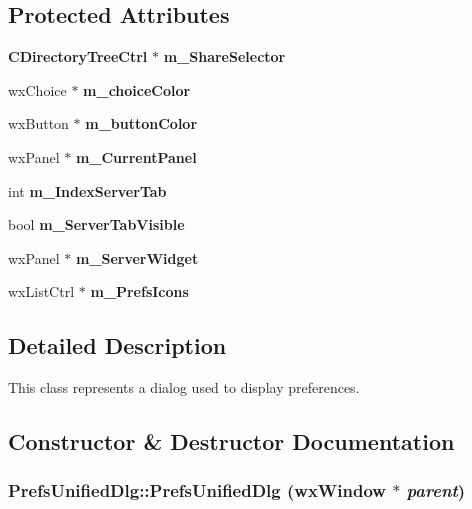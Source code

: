 \subsection*{Protected Attributes}
\begin{DoxyCompactItemize}
\item 
{\bf CDirectoryTreeCtrl} $\ast$ {\bf m\_\-ShareSelector}\label{classPrefsUnifiedDlg_a396a826d7bec6bb5ed15871d62a4e62c}

\item 
wxChoice $\ast$ {\bf m\_\-choiceColor}\label{classPrefsUnifiedDlg_ab6b3b1e27ca9256dfb94d5a53ce4969f}

\item 
wxButton $\ast$ {\bf m\_\-buttonColor}\label{classPrefsUnifiedDlg_a4dd3866d5583e7885e766413f66dbe0a}

\item 
wxPanel $\ast$ {\bf m\_\-CurrentPanel}\label{classPrefsUnifiedDlg_ac0452c405e88820156fda709ae8c5667}

\item 
int {\bf m\_\-IndexServerTab}\label{classPrefsUnifiedDlg_a78ca03e84aa0212cb2cf984ccb689104}

\item 
bool {\bfseries m\_\-ServerTabVisible}\label{classPrefsUnifiedDlg_a2121c574a3add8779964411fb9bd827e}

\item 
wxPanel $\ast$ {\bfseries m\_\-ServerWidget}\label{classPrefsUnifiedDlg_a00b1c0903840c52d7a17bde90cc23636}

\item 
wxListCtrl $\ast$ {\bfseries m\_\-PrefsIcons}\label{classPrefsUnifiedDlg_abc90b550b2f2529ece56e8e08175d9a6}

\end{DoxyCompactItemize}


\subsection{Detailed Description}
This class represents a dialog used to display preferences. 

\subsection{Constructor \& Destructor Documentation}
\subsubsection[{PrefsUnifiedDlg}]{\setlength{\rightskip}{0pt plus 5cm}PrefsUnifiedDlg::PrefsUnifiedDlg (wxWindow $\ast$ {\em parent})}\label{classPrefsUnifiedDlg_a7322e89dee660eeb40180ad03f140100}



